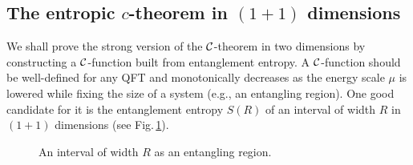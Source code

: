\subsection{The entropic $c$-theorem in $(1+1)$ dimensions}

We shall prove the strong version of the ${\cal C}$-theorem in two dimensions
by constructing a ${\cal C}$-function built from entanglement entropy.
A ${\cal C}$-function should be well-defined for any QFT and monotonically decreases as  the energy scale $\mu$ is lowered while fixing the size of a system (e.g., an entangling region).
One good candidate for it is the entanglement entropy $S(R)$ of an interval of width $R$ in $(1+1)$ dimensions (see Fig.\,\ref{fig:2dCFT_EE2}).
\begin{figure}[h]
\centering
{}
\caption{An interval of width $R$ as an entangling region.}
\label{fig:2dCFT_EE2}
\end{figure}

